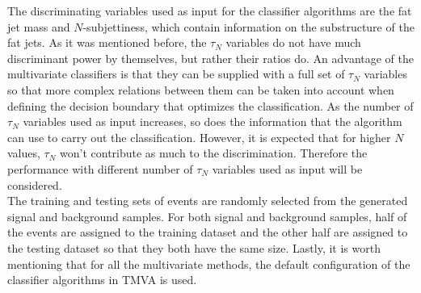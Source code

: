\documentclass[main]{subfiles} %
\begin{document}
The discriminating variables used as input for the classifier algorithms are the fat jet mass and $N$-subjettiness, which contain information on the substructure of the fat jets. As it was mentioned before, the $\tau_N$ variables do not have much discriminant power by themselves, but rather their ratios do. An advantage of the multivariate classifiers is that they can be supplied with a full set of $\tau_N$ variables so that more complex relations between them can be taken into account when defining the decision boundary that optimizes the classification. As the number of $\tau_N$ variables used as input increases, so does the information that the algorithm can use to carry out the classification. However, it is expected that for higher $N$ values, $\tau_N$ won't contribute as much to the discrimination. Therefore the performance with different number of $\tau_N$ variables used as input will be considered. \\

The training and testing sets of events are randomly selected from the generated signal and background samples. For both signal and background samples, half of the events are assigned to the training dataset and the other half are assigned to the testing dataset so that they both have the same size. Lastly, it is worth mentioning that for all the multivariate methods, the default configuration of the classifier algorithms in \textsc{TMVA} is used. 




















\biblio
\end{document}
